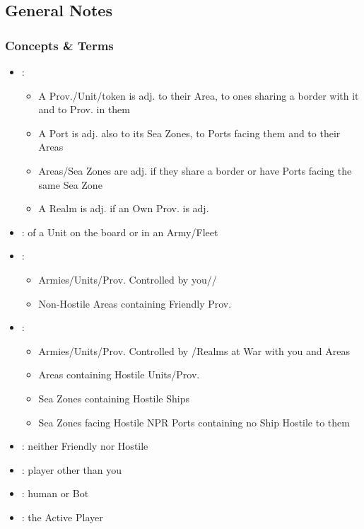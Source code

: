 \documentclass[10pt]{article}
\begin{document}
\addbackground
\addfooter


\subsection*{General Notes }
\subsubsection*{Concepts \& Terms}
\begin{itemize}
	\item {}:
	\begin{itemize}
		\item A Prov./Unit/token is adj. to their Area, to ones sharing a border with it and to Prov. in them
		\item A Port is adj. also to its Sea Zones, to Ports facing them and to their Areas
		\item Areas/Sea Zones are adj. if they share a border or have Ports facing the same Sea Zone
		\item A Realm is adj. if an Own Prov. is adj.
	\end{itemize}
	\item {}: of a Unit on the board or in an Army/Fleet
	\item {}:
	\begin{itemize}
		\item Armies/Units/Prov. Controlled by you/\ally/\vassal
		\item Non-Hostile Areas containing Friendly Prov.
	\end{itemize}
	\item {}:
	\begin{itemize}
		\item Armies/Units/Prov. Controlled by \rebels/Realms at War with you and Areas
		\item Areas containing Hostile Units/Prov.
		\item Sea Zones containing Hostile Ships
		\item Sea Zones facing Hostile NPR Ports  containing no Ship Hostile to them
	\end{itemize}
	\item {}: neither Friendly nor Hostile
	\item {}: player other than you
	\item {}: human or Bot
	\item {}: the Active Player

\end{itemize}
\end{document}
